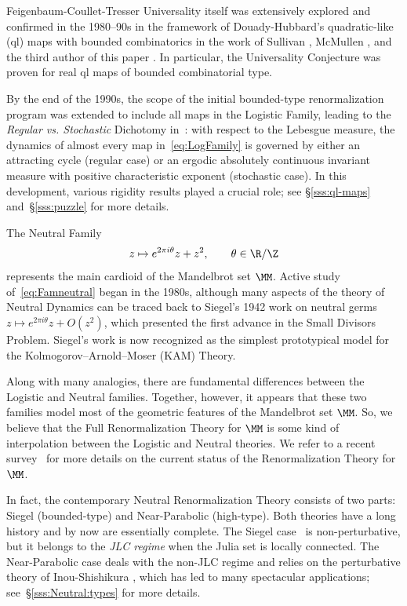 \documentclass{amsart}
\begin{document}
 Feigenbaum-Coullet-Tresser Universality itself was extensively explored  and confirmed in the 1980--90s  
 in the framework of Douady-Hubbard's quadratic-like (ql) maps with bounded combinatorics
 in the work of Sullivan \cite{SulICM,Sul92}, McMullen \cite{McM96}, 
 and the third author of this paper \cite{L99}. 
 In particular, the Universality Conjecture was proven for real ql maps of bounded combinatorial type. 
 
 By the end of the 1990s, the scope of the initial bounded-type renormalization program was extended to include all maps in the Logistic Family,
 leading to the \emph{Regular vs. Stochastic} Dichotomy in~\cite{L02}: with respect to the Lebesgue measure, the dynamics of almost every map in~\eqref{eq:LogFamily} 
 is governed by either an attracting cycle (regular case) or an ergodic absolutely continuous invariant measure with positive characteristic exponent (stochastic case).
 In this development, various rigidity results played a crucial role; see \S\ref{sss:ql-maps} and~\S\ref{sss:puzzle} for more details.

The Neutral Family
\begin{equation}
\label{eq:Famneutral} z\mapsto e^{2\pi i \theta} z+z^2, \qquad \theta\in \R/\Z
\end{equation}
represents 
the main cardioid of the Mandelbrot set $\MM$. Active study of~\eqref{eq:Famneutral} began in the 1980s, although many aspects of the theory of Neutral Dynamics can be traced back to Siegel's 1942 work on neutral germs $z\mapsto e^{2\pi i \theta} z+O(z^2)$, 
which presented the first advance in the Small Divisors Problem. 
Siegel's work is now recognized as the simplest prototypical model for 
the  Kolmogorov--Arnold--Moser (KAM) Theory.

Along with many analogies,
there are fundamental differences between the Logistic 
and Neutral 
families. Together, however, it appears that these two families model most of the geometric features of the Mandelbrot set $\MM$.  
So, we believe that 
the Full Renormalization Theory for  $\MM$ is some kind of interpolation 
between the Logistic and Neutral theories. We refer to a recent survey~\cite{DudICM} for more details on the current status of the Renormalization Theory for $\MM$.

In fact,  the contemporary Neutral Renormalization Theory consists of two parts: 
Siegel (bounded-type) and Near-Parabolic (high-type). Both theories have a long history 
and by now are essentially complete.  
The Siegel case~\cite{McM98,DLS} is non-perturbative, 
but it belongs to the \emph{JLC regime} 
when the Julia set is locally connected.
The Near-Parabolic case deals with 
the non-JLC regime and relies on the perturbative theory of Inou-Shishikura \cite{IS}, which has led to many spectacular applications; see~\S\ref{sss:Neutral:types} for more details.
\end{document}
